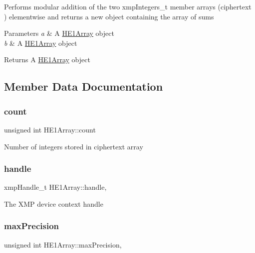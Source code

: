 Performs modular addition of the two {\ttfamily xmp\+Integers\+\_\+t} member arrays ({\ttfamily ciphertext} ) elementwise and returns a new object containing the array of sums 
\begin{DoxyParams}{Parameters}
{\em a} & A {\ttfamily \hyperlink{classHE1Array}{H\+E1\+Array}} object \\
\hline
{\em b} & A {\ttfamily \hyperlink{classHE1Array}{H\+E1\+Array}} object \\
\hline
\end{DoxyParams}
\begin{DoxyReturn}{Returns}
A {\ttfamily \hyperlink{classHE1Array}{H\+E1\+Array}} object 
\end{DoxyReturn}


\subsection{Member Data Documentation}
\mbox{\label{classHE1Array_a486ac51b636d5434c6d456a0b470ab1e}} 
\subsubsection{\texorpdfstring{count}{count}}
{\footnotesize\ttfamily unsigned int H\+E1\+Array\+::count\hspace{0.3cm}{\ttfamily [private]}}

Number of integers stored in ciphertext array \mbox{\label{classHE1Array_a6f4fd4ae4280b6ac4abe146f80a0ade4}} 
\subsubsection{\texorpdfstring{handle}{handle}}
{\footnotesize\ttfamily xmp\+Handle\+\_\+t H\+E1\+Array\+::handle\hspace{0.3cm}{\ttfamily [static]}, {\ttfamily [private]}}

The X\+MP device context handle \mbox{\label{classHE1Array_a552ef796b7fa4c00e142acdc78852a89}} 
\subsubsection{\texorpdfstring{max\+Precision}{maxPrecision}}
{\footnotesize\ttfamily unsigned int H\+E1\+Array\+::max\+Precision\hspace{0.3cm}{\ttfamily [static]}, {\ttfamily [private]}}

